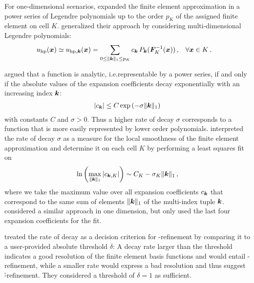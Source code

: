 For one-dimensional scenarios, \textcite{mavriplis1994} expanded the finite element approximation in a power series of Legendre polynomials up to the order $p_K$ of the assigned finite element on cell $K$. \textcites{houston2005}{eibner2007} generalized their approach by considering multi-dimensional Legendre polynomials:
\begin{align}
u_\text{hp} (\vec{x}) \simeq u_{\text{hp},\tuple{k}} (\vec{x}) &= \sum\limits_{0 \leq \|\tuple{k}\|_1 \leq p_K} c_\tuple{k} \, P_\tuple{k}(\mat{F}_K^{-1}(\vec{x})) \,\text{,} \quad \forall \vec{x} \in K \,\text{.}
\end{align}

\textcite[Prop.~2]{eibner2007} argued that a function is analytic, i.e.\@ representable by a power series, if and only if the absolute values of the expansion coefficients decay exponentially with an increasing index $\tuple{k}$:
\begin{align}
|c_\tuple{k}| \leq C \exp\left( - \sigma \|\tuple{k}\|_1\right)
\end{align}
with constants $C$ and $\sigma > 0$. Thus a higher rate of decay $\sigma$ corresponds to a function that is more easily represented by lower order polynomials. \textcites[Sec.~2.4]{houston2005}[Ch.~4]{eibner2007} interpreted the rate of decay $\sigma$ as a measure for the local smoothness of the finite element approximation and determine it on each cell $K$ by performing a least squares fit on
\begin{align}
\ln \left( \max\limits_{\|\tuple{k}\|_1} |c_{\tuple{k},K}| \right) \sim C_K - \sigma_K \|\tuple{k}\|_1 \,\text{,}
\end{align}
where we take the maximum value over all expansion coefficients $c_\tuple{k}$ that correspond to the same sum of elements $\|\tuple{k}\|_1$ of the multi-index tuple $\tuple{k}$. \textcite{mavriplis1994} considered a similar approach in one dimension, but only used the last four expansion coefficients for the fit.

\textcite{mavriplis1994, eibner2007} treated the rate of decay as a decision criterion for \hp-refinement by comparing it to a user-provided absolute threshold $\delta$: A decay rate larger than the threshold indicates a good resolution of the finite element basis functions and would entail \p-refinement, while a smaller rate would express a bad resolution and thus suggest \h-refinement. They considered a threshold of $\delta = 1$ as sufficient.

